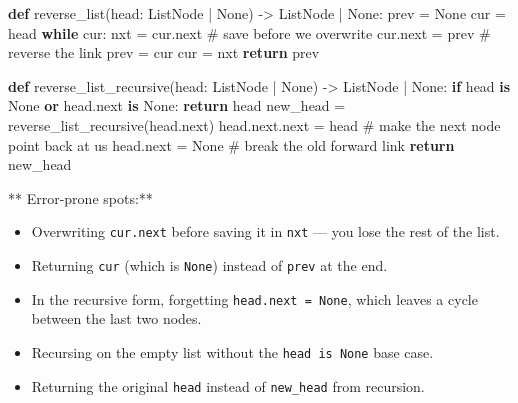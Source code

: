 \documentclass[11pt]{article}
\providecommand{\tightlist}{\setlength{\itemsep}{1pt}\setlength{\parskip}{0pt}}
\newenvironment{Shaded}{\begin{snugshade}}{\end{snugshade}}
\newcommand{\BuiltInTok}[1]{\textcolor[rgb]{0.50,0.55,0.55}{#1}}
\newcommand{\CommentTok}[1]{\textcolor[rgb]{0.48,0.49,0.49}{#1}}
\newcommand{\ControlFlowTok}[1]{\textcolor[rgb]{0.99,0.74,0.29}{\textbf{#1}}}
\newcommand{\KeywordTok}[1]{\textcolor[rgb]{0.81,0.81,0.76}{\textbf{#1}}}
\newcommand{\NormalTok}[1]{\textcolor[rgb]{0.81,0.81,0.76}{#1}}
\newcommand{\OperatorTok}[1]{\textcolor[rgb]{0.81,0.81,0.76}{#1}}
\newcommand{\VariableTok}[1]{\textcolor[rgb]{0.15,0.68,0.68}{#1}}
\begin{document}

\begin{Shaded}
\begin{Highlighting}[]
\KeywordTok{def}\NormalTok{ reverse\_list(head: ListNode }\OperatorTok{|} \VariableTok{None}\NormalTok{) }\OperatorTok{{-}\textgreater{}}\NormalTok{ ListNode }\OperatorTok{|} \VariableTok{None}\NormalTok{:}
\NormalTok{    prev }\OperatorTok{=} \VariableTok{None}
\NormalTok{    cur }\OperatorTok{=}\NormalTok{ head}
    \ControlFlowTok{while}\NormalTok{ cur:}
\NormalTok{        nxt }\OperatorTok{=}\NormalTok{ cur.}\BuiltInTok{next}      \CommentTok{\# save before we overwrite}
\NormalTok{        cur.}\BuiltInTok{next} \OperatorTok{=}\NormalTok{ prev     }\CommentTok{\# reverse the link}
\NormalTok{        prev }\OperatorTok{=}\NormalTok{ cur}
\NormalTok{        cur }\OperatorTok{=}\NormalTok{ nxt}
    \ControlFlowTok{return}\NormalTok{ prev}

\KeywordTok{def}\NormalTok{ reverse\_list\_recursive(head: ListNode }\OperatorTok{|} \VariableTok{None}\NormalTok{) }\OperatorTok{{-}\textgreater{}}\NormalTok{ ListNode }\OperatorTok{|} \VariableTok{None}\NormalTok{:}
    \ControlFlowTok{if}\NormalTok{ head }\KeywordTok{is} \VariableTok{None} \KeywordTok{or}\NormalTok{ head.}\BuiltInTok{next} \KeywordTok{is} \VariableTok{None}\NormalTok{:}
        \ControlFlowTok{return}\NormalTok{ head}
\NormalTok{    new\_head }\OperatorTok{=}\NormalTok{ reverse\_list\_recursive(head.}\BuiltInTok{next}\NormalTok{)}
\NormalTok{    head.}\BuiltInTok{next}\NormalTok{.}\BuiltInTok{next} \OperatorTok{=}\NormalTok{ head   }\CommentTok{\# make the next node point back at us}
\NormalTok{    head.}\BuiltInTok{next} \OperatorTok{=} \VariableTok{None}        \CommentTok{\# break the old forward link}
    \ControlFlowTok{return}\NormalTok{ new\_head}
\end{Highlighting}
\end{Shaded}

** Error-prone spots:**

\begin{itemize}
\tightlist
\item
  Overwriting \texttt{cur.next} before saving it in \texttt{nxt} --- you lose the rest of the list.
\item
  Returning \texttt{cur} (which is \texttt{None}) instead of \texttt{prev} at the end.
\item
  In the recursive form, forgetting \texttt{head.next\ =\ None}, which leaves a cycle between the last two nodes.
\item
  Recursing on the empty list without the \texttt{head\ is\ None} base case.
\item
  Returning the original \texttt{head} instead of \texttt{new\_head} from recursion.
\end{itemize}
\end{document}

